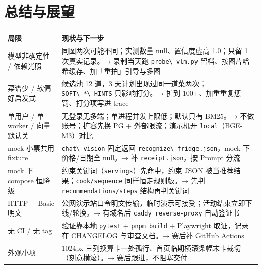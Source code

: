 \section{总结与展望}\label{ux5c40ux9650ux4e0eux4e0bux4e00ux6b65}

{\def\LTcaptype{none} %
\begin{longtable}[]{@{}
  >{\raggedright\arraybackslash}p{}
  >{\raggedright\arraybackslash}p{}@{}}
\toprule\noalign{}
\begin{minipage}[b]{\linewidth}\raggedright
局限
\end{minipage} & \begin{minipage}[b]{\linewidth}\raggedright
现状与下一步
\end{minipage} \\
\midrule\noalign{}
\endhead
\bottomrule\noalign{}
\endlastfoot
模型非确定性 / 依赖光照 & 同图两次可能不同；实测数量 null、置信度虚高
1.0；只留 1 次真实记录。→ 录制当天跑
\passthrough{\lstinline!probe\_vlm.py!}
留档、按图片哈希缓存、加「重拍」引导与多图 \\
菜谱少 / 软偏好启发式 & 候选池 12 道，3
天计划出现过同一道菜两次；\passthrough{\lstinline!SOFT\_*\_HINTS!}
只影响打分。→ 扩到 100+、加重重复惩罚、打分项写进 trace \\
单用户 / 单 worker / 向量默认关 &
无登录无多端；单进程并发上限低；默认只有 BM25。→ 不做账号；扩容先换 PG +
外部限流；演示机开 \passthrough{\lstinline!local!}（BGE-M3）对比 \\
mock 小票共用 fixture & \passthrough{\lstinline!chat\_vision!} 固定返回
\passthrough{\lstinline!recognize\_fridge.json!}，mock 下价格/日期全
null。→ 补 \passthrough{\lstinline!receipt.json!}，按 Prompt 分流 \\
mock 下 compose 恒降级 &
约束关键词（\passthrough{\lstinline!servings!}）先命中，约束 JSON
被当推荐结果；\passthrough{\lstinline!cook/sequence!} 同样恒走规则版。→
先判 \passthrough{\lstinline!recommendations/steps!} 结构再判关键词 \\
HTTP + Basic 明文 &
公网演示站口令明文传输，临时演示可接受；活动结束立即下线/轮换。→
有域名后 \passthrough{\lstinline!caddy reverse-proxy!} 自动签证书 \\
无 CI / 无 tag & 验证靠本地 \passthrough{\lstinline!pytest!} +
\passthrough{\lstinline!pnpm build!} + Playwright 取证，记录在 CHANGELOG
与审查文档。→ 赛后补 GitHub Actions \\
外观小项 & 1024px
三列换算卡一处孤行、首页临期横滚条幅末卡裁切（刻意横滚）。→
赛后跟进，不阻塞交付 \\
\end{longtable}
}

